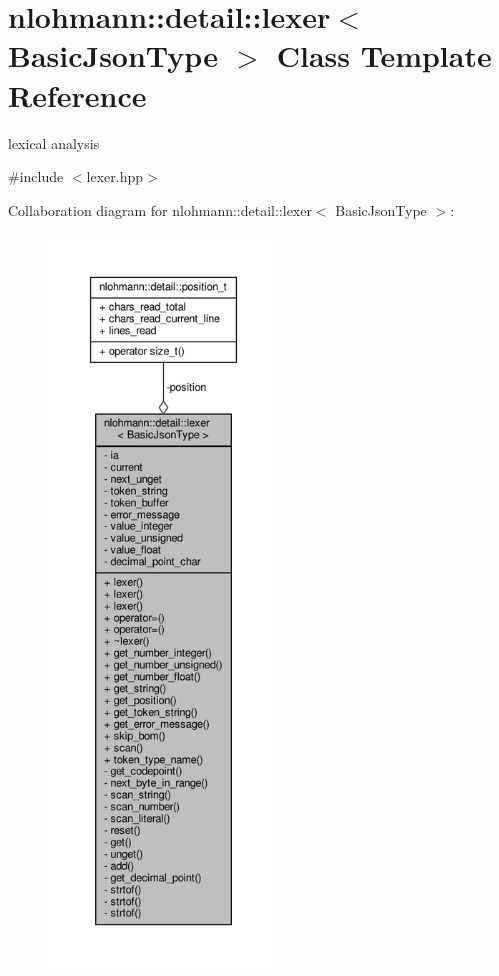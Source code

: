 \hypertarget{classnlohmann_1_1detail_1_1lexer}{}\section{nlohmann\+:\+:detail\+:\+:lexer$<$ Basic\+Json\+Type $>$ Class Template Reference}
\label{classnlohmann_1_1detail_1_1lexer}


lexical analysis  




{\ttfamily \#include $<$lexer.\+hpp$>$}



Collaboration diagram for nlohmann\+:\+:detail\+:\+:lexer$<$ Basic\+Json\+Type $>$\+:\nopagebreak
\begin{figure}[H]
\begin{center}
\leavevmode
\includegraphics[height=550pt]{classnlohmann_1_1detail_1_1lexer__coll__graph}
\end{center}
\end{figure}
